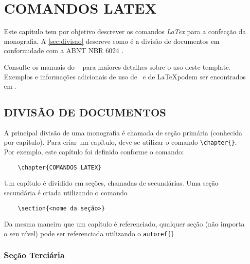 \chapter{COMANDOS LATEX}
\label{cap:comandos}

Este capítulo tem por objetivo descrever os comandos \textit{LaTex} para a confecção da monografia. A \autoref{sec:divisao} descreve como é a divisão de documentos em conformidade com a ABNT NBR 6024 \cite{NBR6024:2012}. 

Consulte os manuais do \abnTeX\
\cite{abntex2classe,abntex2cite,abntex2cite-alf} para maiores detalhes sobre o uso deste template. Exemplos e informações adicionais de uso de \abnTeX\ e de \LaTeX podem ser encontrados em .

\section{DIVISÃO DE DOCUMENTOS}
\label{sec:divisao}

A principal divisão de uma monografia é chamada de seção primária (conhecida por capítulo)\cite{NBR6024:2012}. Para criar um capítulo, deve-se utilizar o comando \verb!\chapter{}!. Por exemplo, este capítulo foi definido conforme o comando:

\begin{verbatim}
    \chapter{COMANDOS LATEX}
\end{verbatim}

Um capítulo é dividido em seções, chamadas de secundárias. Uma seção secundária é criada utilizando o comando

\begin{verbatim}
    \section{<nome da seção>} 
\end{verbatim}

Da mesma maneira que um capítulo é referenciado, qualquer seção (não importa o seu nível) pode ser referenciada utilizando o \verb!autoref{}!

\subsection{Seção Terciária}
\label{sec:secaoTerciaria}

